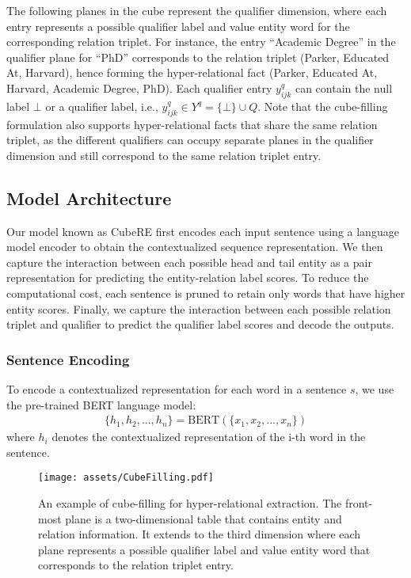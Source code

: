 \documentclass[11pt]{article}
\newcommand{\modelname}{CubeRE}
\begin{document}
The following planes in the cube represent the qualifier dimension, where each entry represents a possible qualifier label and value entity word for the corresponding relation triplet.
For instance, the entry ``Academic Degree'' in the qualifier plane for ``PhD'' corresponds to the relation triplet (Parker, Educated At, Harvard), hence forming the hyper-relational fact (Parker, Educated At, Harvard, Academic Degree, PhD).
Each qualifier entry $y_{ijk}^q$ can contain the null label $\bot$ or a qualifier label, i.e., $y_{ijk}^q \in Y^q = \{\bot\} \cup Q$.
Note that the cube-filling formulation also supports hyper-relational facts that share the same relation triplet, as the different qualifiers can occupy separate planes in the qualifier dimension and still correspond to the same relation triplet entry.



\subsection{Model Architecture}

Our model known as \modelname{} first encodes each input sentence using a language model encoder to obtain the contextualized sequence representation.
We then capture the interaction between each possible head and tail entity as a pair representation for predicting the entity-relation label scores.
To reduce the computational cost, each sentence is pruned to retain only words that have higher entity scores.
Finally, we capture the interaction between each possible relation triplet and qualifier 
to predict the qualifier label scores and decode the outputs.

\subsubsection{Sentence Encoding}

To encode a contextualized representation for each word in a sentence $s$, we use the pre-trained BERT \citep{devlin-etal-2019-bert} language model:
\begin{align}
    \{h_1, h_2, ..., h_n\} = \text{BERT}(\{x_1, x_2, ..., x_n\})
\end{align}
where $h_i$ denotes the contextualized representation of the i-th word in the sentence.


\begin{figure}[!t]
\centering
\texttt{[image: assets/CubeFilling.pdf]}
\vspace{-3mm}
\caption{
An example of cube-filling for hyper-relational extraction.
The front-most plane is a two-dimensional table that contains entity and relation information.
It extends to the third dimension where each plane represents a possible qualifier label and value entity word that corresponds to the relation triplet entry.
\vspace{-5mm}}
\label{fig:cube}
\end{figure}
\end{document}
